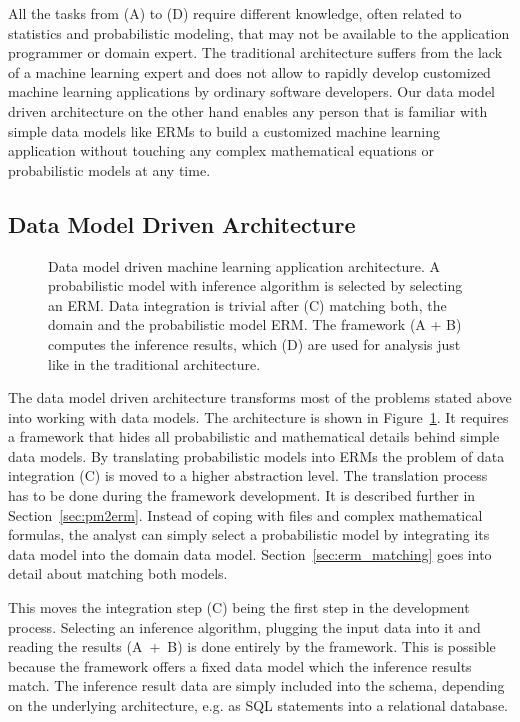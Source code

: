 All the tasks from (A) to (D) require different knowledge, often related to statistics and probabilistic modeling, that may not be available to the application programmer or domain expert. The traditional architecture suffers from the lack of a machine learning expert and does not allow to rapidly develop customized machine learning applications by ordinary software developers. Our data model driven architecture on the other hand enables any person that is familiar with simple data models like ERMs to build a customized machine learning application without touching any complex mathematical equations or probabilistic models at any time.

\subsection{Data Model Driven Architecture}

\begin{figure}
\centering
\scalebox{\tikzScale}{\adjustTikzSize }
\caption[Data model driven machine learning application architecture]{Data model driven machine learning application architecture. A probabilistic model with inference algorithm is selected by selecting an ERM. Data integration is trivial after (C) matching both, the domain and the probabilistic model ERM. The framework (A + B) computes the inference results, which (D) are used for analysis just like in the traditional architecture.}\label{fig:ml-application-architecture-dm}
\end{figure}

The data model driven architecture transforms most of the problems stated above into working with data models. The architecture is shown in Figure~\ref{fig:ml-application-architecture-dm}. It requires a framework that hides all probabilistic and mathematical details behind simple data models. By translating probabilistic models into ERMs the problem of data integration (C) is moved to a higher abstraction level. The translation process has to be done during the framework development. It is described further in Section~\ref{sec:pm2erm}. Instead of coping with files and complex mathematical formulas, the analyst can simply select a probabilistic model by integrating its data model into the domain data model. Section~\ref{sec:erm_matching} goes into detail about matching both models.

This moves the integration step (C) being the first step in the development process. Selecting an inference algorithm, plugging the input data into it and reading the results (A~+~B) is done entirely by the framework. This is possible because the framework offers a fixed data model which the inference results match. The inference result data are simply included into the schema, depending on the underlying architecture, e.g. as SQL statements into a relational database.


